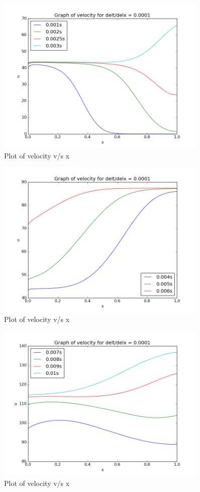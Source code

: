 \documentclass[11pt, a4paper]{article}
\begin{document}
\begin{figure}[H]
 \centering
 \includegraphics[width = 0.9\textwidth]{lax_fed_1_4.png}
 \caption{Plot of velocity v/s x}
\end{figure}
\begin{figure}[H]
 \centering
 \includegraphics[width = 0.9\textwidth]{lax_fed_1_5.png}
 \caption{Plot of velocity v/s x}
\end{figure}
\begin{figure}[H]
 \centering
 \includegraphics[width = 0.9\textwidth]{lax_fed_1_6.png}
 \caption{Plot of velocity v/s x}
\end{figure}
\end{document}
